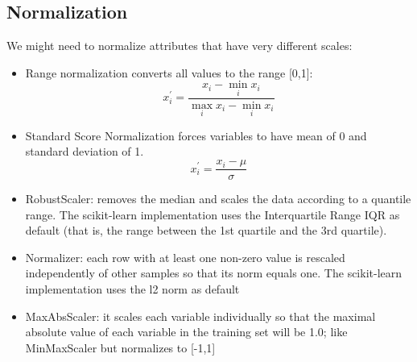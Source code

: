 \subsection{Normalization}
We might need to normalize attributes that have very different scales: 
\begin{itemize}
    \item Range normalization converts all values to the range [0,1]: 
        \[x_i^\prime=\dfrac{x_i-\min_ix_i}{\max_ix_i-\min_ix_i}\]
    \item Standard Score Normalization forces variables to have mean of 0 and standard deviation of 1.
        \[x_i^\prime=\dfrac{x_i-\mu}{\sigma}\]
    \item RobustScaler: removes the median and scales the data according to a quantile range. 
    The scikit-learn implementation uses the Interquartile Range IQR as default (that is, the range between the 1st quartile and the 3rd quartile).
    \item Normalizer: each row with at least one non-zero value is rescaled independently of other samples so that its norm equals one.
        The scikit-learn implementation uses the l2 norm as default
    \item MaxAbsScaler: it scales each variable individually so that the maximal absolute value of each variable in the training set will be 1.0; like MinMaxScaler but normalizes to [-1,1]
\end{itemize}

